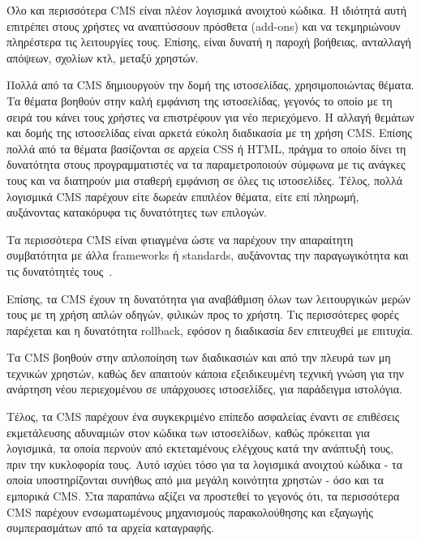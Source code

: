 \documentclass[12pt]{report}
\begin{document}
Όλο και περισσότερα \textlatin{CMS} είναι πλέον λογισμικά ανοιχτού κώδικα. Η ιδιότητά αυτή επιτρέπει στους χρήστες να αναπτύσσουν πρόσθετα (\textlatin{add-ons}) και να τεκμηριώνουν πληρέστερα τις λειτουργίες τους. Επίσης, είναι δυνατή η παροχή βοήθειας, ανταλλαγή απόψεων, σχολίων κτλ, μεταξύ χρηστών.

Πολλά από τα \textlatin{CMS} δημιουργούν την δομή της ιστοσελίδας, χρησιμοποιώντας θέματα. Τα θέματα βοηθούν στην καλή εμφάνιση της ιστοσελίδας, γεγονός το οποίο με τη σειρά του κάνει τους χρήστες να επιστρέφουν για νέο περιεχόμενο. Η αλλαγή θεμάτων και δομής της ιστοσελίδας είναι αρκετά εύκολη διαδικασία με τη χρήση \textlatin{CMS}. Επίσης πολλά από τα θέματα βασίζονται σε αρχεία \textlatin{CSS} ή \textlatin{HTML}, πράγμα το οποίο δίνει τη δυνατότητα στους προγραμματιστές να τα παραμετροποιούν σύμφωνα με τις ανάγκες τους και να διατηρούν μια σταθερή εμφάνιση σε όλες τις ιστοσελίδες. Τέλος, πολλά λογισμικά \textlatin{CMS} παρέχουν είτε δωρεάν επιπλέον θέματα, είτε επί πληρωμή, αυξάνοντας κατακόρυφα τις δυνατότητες των επιλογών.

Τα περισσότερα \textlatin{CMS} είναι φτιαγμένα ώστε να παρέχουν την απαραίτητη συμβατότητα με άλλα \textlatin{frameworks} ή \textlatin{standards}, αυξάνοντας την παραγωγικότητα και τις δυνατότητές τους~\cite{wikipedia_2017:02}.

Επίσης, τα \textlatin{CMS} έχουν τη δυνατότητα για αναβάθμιση όλων των λειτουργικών μερών τους με τη χρήση απλών οδηγών, φιλικών προς το χρήστη. Τις περισσότερες φορές παρέχεται και η δυνατότητα \textlatin{rollback}, εφόσον η διαδικασία δεν επιτευχθεί με επιτυχία.

Τα \textlatin{CMS} βοηθούν στην απλοποίηση των διαδικασιών και από την πλευρά των μη τεχνικών χρηστών, καθώς δεν απαιτούν κάποια εξειδικευμένη τεχνική γνώση για την ανάρτηση νέου περιεχομένου σε υπάρχουσες ιστοσελίδες, για παράδειγμα ιστολόγια.

Τέλος, τα \textlatin{CMS} παρέχουν ένα συγκεκριμένο επίπεδο ασφαλείας έναντι σε επιθέσεις εκμετάλευσης αδυναμιών στον κώδικα των ιστοσελίδων, καθώς πρόκειται για λογισμικά, τα οποία περνούν από εκτεταμένους ελέγχους κατά την ανάπτυξή τους, πριν την κυκλοφορία τους. Αυτό ισχύει τόσο για τα λογισμικά ανοιχτού κώδικα - τα οποία υποστηρίζονται συνήθως από μια μεγάλη κοινότητα χρηστών - όσο και τα εμπορικά \textlatin{CMS}. Στα παραπάνω αξίζει να προστεθεί το γεγονός ότι, τα περισσότερα \textlatin{CMS} παρέχουν ενσωματωμένους μηχανισμούς παρακολούθησης και εξαγωγής συμπερασμάτων από τα αρχεία καταγραφής.
\end{document}

